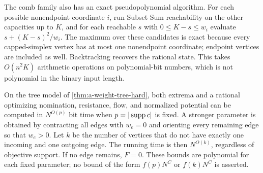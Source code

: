 The comb family also has an exact pseudopolynomial algorithm. For each
possible nonendpoint coordinate $i$, run Subset Sum reachability on the
other capacities up to $K$, and for each reachable $s$ with
$0\le K-s\le w_i$ evaluate $s+(K-s)^2/w_i$. The maximum over these
candidates is exact because every capped-simplex vertex has at most one
nonendpoint coordinate; endpoint vertices are included as well.
Backtracking recovers the rational state. This takes $O(n^2K)$ arithmetic
operations on polynomial-bit numbers, which is not polynomial in the
binary input length.

\begin{theorem}
\label{thm:a-weight-tree-algorithm}
On the tree model of \cref{thm:a-weight-tree-hard}, both extrema and a
rational optimizing nomination, resistance, flow, and normalized potential
can be computed in $N^{O(p)}$ bit time when $p=|\operatorname{supp} c|$ is fixed.
A stronger parameter is obtained by contracting all edges with $w_e=0$
and orienting every remaining edge so that $w_e>0$. Let $k$ be the number
of vertices that do not have exactly one incoming and one outgoing edge.
The running time is then $N^{O(k)}$, regardless of objective support.
If no edge remains, $F=0$. These bounds are polynomial for each fixed
parameter; no bound of the form $f(p)N^C$ or $f(k)N^C$ is asserted.
\end{theorem}
